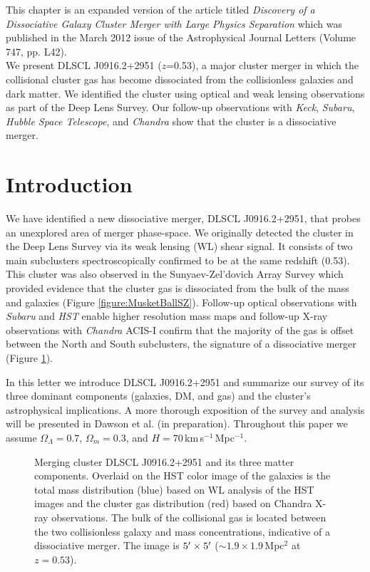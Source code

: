 \label{chapter:2}

\noindent This chapter is an expanded version of the article titled \emph{Discovery of a Dissociative Galaxy Cluster Merger with Large Physics Separation} which was published in the March 2012 issue of the Astrophysical Journal Letters (Volume 747, pp. L42). \\

We present DLSCL J0916.2+2951 ($z$=0.53), a major cluster merger in which the collisional cluster gas has become dissociated from the collisionless galaxies and dark matter.
We identified the cluster using optical and weak lensing observations as part of the Deep Lens Survey. 
Our follow-up observations with {\it Keck}, {\it Subaru}, {\it Hubble Space Telescope}, and {\it Chandra} show that the cluster is a dissociative merger.


\section{Introduction}

We have identified a new dissociative merger, DLSCL J0916.2+2951, that probes an unexplored area of merger phase-space.  
We originally detected the cluster in the Deep Lens Survey \citep[DLS;][]{Wittman:2002cp} via its weak lensing (WL) shear signal. 
It consists of two main subclusters  spectroscopically confirmed to be at the same redshift (0.53).
This cluster was also observed in the Sunyaev-Zel'dovich Array Survey \citep{Muchovej:2010gc} which provided evidence that the cluster gas is dissociated from the bulk of the mass and galaxies (Figure \ref{figure:MusketBallSZ}).
Follow-up optical observations with {\it Subaru} and {\it HST} enable higher resolution mass maps and follow-up X-ray observations with {\it Chandra} ACIS-I confirm that the majority of the gas is offset between the North and South subclusters, the signature of a dissociative merger (Figure \ref{fig1}).

In this letter we introduce DLSCL J0916.2+2951 and summarize our survey of its three dominant components (galaxies, DM, and gas) and the cluster's astrophysical implications.
A more thorough exposition of the survey and analysis will be presented in Dawson et al. (in preparation).
Throughout this paper we assume $\Omega_{\Lambda}=0.7$, $\Omega_m=0.3$, and $H=70$\,km\,s$^{-1}$\,Mpc$^{-1}$.

\begin{figure}
\caption[Merging cluster DLSCL J0916.2+2951 and its three matter components.]{Merging cluster DLSCL J0916.2+2951 and its three matter components. 
Overlaid on the HST color image of the galaxies is the total mass distribution (blue) based on WL analysis of the HST images and the cluster gas distribution (red) based on Chandra X-ray observations.  
The bulk of the collisional gas is located between the two collisionless galaxy and mass concentrations, indicative of a dissociative merger. 
The image is $5\mbox{$^\prime$} \times 5\mbox{$^\prime$}$ ($\sim 1.9\times 1.9$\,Mpc$^2$ at $z=0.53$).\label{fig1}}
\end{figure}

